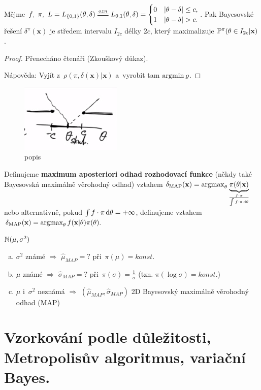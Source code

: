 \begin{theorem}
	Mějme $f,~\pi,~L=L_{\{0,1\}}(\t,\delta)\equal{ozn}L_{0,1}(\t,\delta)=\begin{cases}
	0&|\t-\delta|\leq c,\\1& |\t-\delta|>c.
	\end{cases}$. Pak Bayesovské řešení $\delta^\pi(\textbf{x})$ je středem intervalu $I_{2c}$ délky $2c$, který maximalizuje $\mathbb{P}^\pi(\theta\in I_{2c}|\textbf{x})$.
	\begin{proof}
		Přenecháno čtenáři (Zkouškový důkaz).
		
		Nápověda: Vyjít z~$\rho(\pi,\delta(\textbf{x})|\textbf{x})$ a~vyrobit tam $\mathop{\mathrm{argmin}} \varrho$.
	\end{proof}
\begin{figure}[h]
	\centering
	\includegraphics[width=0.7\linewidth]{pictures/10.12-2}
	\caption{popis}
	\label{fig:105}
\end{figure}
\end{theorem}
\FloatBarrier

\begin{define}
	Definujeme \textbf{maximum aposteriori odhad rozhodovací funkce} (někdy také Bayesovská maximálně věrohodný odhad) vztahem $\delta_\mathrm{MAP}(\textbf{x})=\mathop{\mathrm{argmax}}_\theta \underbrace{\pi(\theta|\textbf{x})}_{\frac{f\cdot\pi}{\int f\cdot\pi\,\mathrm{d}\theta}}$ nebo alternativně, pokud $\int f\cdot\pi\,\mathrm{d}\theta=+\infty$, definujeme vztahem  $\delta_\mathrm{MAP}(\textbf{x})=\mathop{\mathrm{argmax}}_\theta f(\textbf{x}|\theta)\pi(\theta).$
\end{define}

\begin{example}
$\mathbb{N}(\mu,\sigma^2)$
\begin{enumerate}[a)]
\item $\sigma^2$ známé $\Rightarrow$ $\widehat{\mu}_{MAP}=?$ při~$\pi(\mu)=konst.$
\item $\mu$ známé $\Rightarrow$ $\widehat{\sigma}_{MAP}=?$ při~$\pi(\sigma)=\frac{1}{\sigma}$ (tzn. $\pi(\log \sigma)=konst.$)
\item $\mu$ i~$\sigma^2$ neznámá $\Rightarrow$ $(\widehat{\mu}_{MAP},\widehat{\sigma}_{MAP})$ 2D Bayesovský maximálně věrohodný odhad (MAP)
\end{enumerate}
\end{example}

\chapter{Vzorkování podle důležitosti, Metropolisův algoritmus, variační Bayes.}



